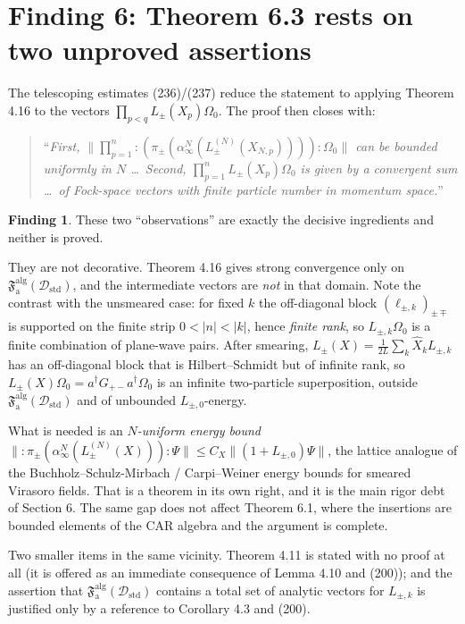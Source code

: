 \documentclass[11pt,a4paper]{article}
\theoremstyle{definition}
\newtheorem{finding}{Finding}
\newcommand{\Dstd}{\mathcal{D}_{\mathrm{std}}}
\begin{document}
\section{Finding 6: Theorem 6.3 rests on two unproved assertions}

\noindent
The telescoping estimates (236)/(237) reduce the statement to applying Theorem 4.16 to the
vectors $\prod_{p<q}L_\pm(X_p)\Omega_0$. The proof then closes with:
\begin{quote}\small
``\emph{First, $\|\prod_{p=1}^n\!:\!(\pi_\pm(\alpha_\infty^N(L^{(N)}_\pm(X_{N,p}))))\!:\Omega_0\|$
can be bounded uniformly in $N$ \dots\ Second, $\prod_{p=1}^nL_\pm(X_p)\Omega_0$ is given by a
convergent sum \dots\ of Fock-space vectors with finite particle number in momentum space.}''
\end{quote}

\begin{finding}
These two ``observations'' are exactly the decisive ingredients and neither is proved.
\end{finding}

\noindent
They are not decorative. Theorem 4.16 gives strong convergence only on
$\mathfrak F^{\mathrm{alg}}_{\mathrm a}(\Dstd)$, and the intermediate vectors are \emph{not} in
that domain. Note the contrast with the unsmeared case: for fixed $k$ the off-diagonal block
$(\ell_{\pm,k})_{\pm\mp}$ is supported on the finite strip $0<|n|<|k|$, hence \emph{finite rank},
so $L_{\pm,k}\Omega_0$ is a finite combination of plane-wave pairs. After smearing,
$L_\pm(X)=\frac1{2L}\sum_k\hat X_k L_{\pm,k}$ has an off-diagonal block that is
Hilbert--Schmidt but of infinite rank, so $L_\pm(X)\Omega_0=a^\dagger G_{+-}a^\dagger\Omega_0$
is an infinite two-particle superposition, outside
$\mathfrak F^{\mathrm{alg}}_{\mathrm a}(\Dstd)$ and of unbounded $L_{\pm,0}$-energy.

What is needed is an \emph{$N$-uniform energy bound}
$\|:\!\pi_\pm(\alpha^N_\infty(L^{(N)}_\pm(X)))\!:\Psi\|\le C_X\|(1+L_{\pm,0})\Psi\|$, the lattice
analogue of the Buchholz--Schulz-Mirbach / Carpi--Weiner energy bounds for smeared Virasoro
fields. That is a theorem in its own right, and it is the main rigor debt of Section 6. The
same gap does not affect Theorem 6.1, where the insertions are bounded elements of the CAR
algebra and the argument is complete.

\medskip\noindent
Two smaller items in the same vicinity. Theorem 4.11 is stated with no proof at all (it is
offered as an immediate consequence of Lemma 4.10 and (200)); and the assertion that
$\mathfrak F^{\mathrm{alg}}_{\mathrm a}(\Dstd)$ contains a total set of analytic vectors for
$L_{\pm,k}$ is justified only by a reference to Corollary 4.3 and (200).
\end{document}
